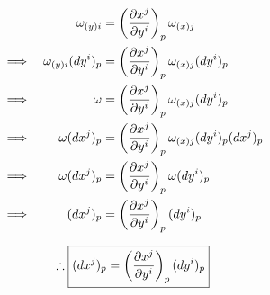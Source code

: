 \begin{align*}
&& \omega_{(y)i} & = \left(\cibasis[x^j]{y^i}\right)_p \omega_{(x)j} \\
\implies && \omega_{(y)i}(dy^i)_p & = \left(\cibasis[x^j]{y^i}\right)_p \omega_{(x)j}(dy^i)_p \\
\implies && \omega & = \left(\cibasis[x^j]{y^i}\right)_p \omega_{(x)j}(dy^i)_p \\
\implies && \omega (dx^j)_p & = \left(\cibasis[x^j]{y^i}\right)_p \omega_{(x)j}(dy^i)_p (dx^j)_p \\
\implies && \omega (dx^j)_p & = \left(\cibasis[x^j]{y^i}\right)_p \omega (dy^i)_p \\
\implies && (dx^j)_p & = \left(\cibasis[x^j]{y^i}\right)_p (dy^i)_p
\end{align*}

\begin{equation}\label{eq:L5_cicobasisIn2Charts}
\therefore \boxed{(dx^j)_p = \left(\cibasis[x^j]{y^i}\right)_p (dy^i)_p}
\end{equation}
